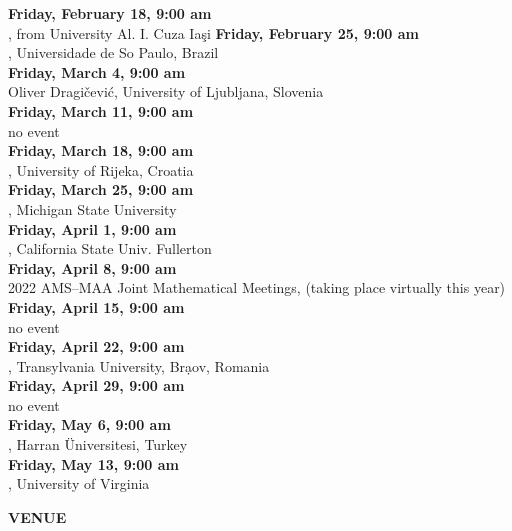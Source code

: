 \documentclass[a4paper]{article}
\begin{document}
\begin{minipage}{0.95\textwidth}
\begin{minipage}[b]{0.47\textwidth}
{\leavevmode \raggedright
\textbf{\color{cprimary} Friday, February 18, 9:00 am}\\ , from University Al. I. Cuza Ia\c{s}i
\textbf{\color{cprimary} Friday, February 25, 9:00 am}\\ , Universidade de So Paulo, Brazil\\
\textbf{\color{cprimary} Friday, March 4, 9:00 am}\\ Oliver Dragi\v{c}evi\'{c}, University of Ljubljana, Slovenia\\
\textbf{\color{cprimary} Friday, March 11, 9:00 am}\\ no event\\
\textbf{\color{cprimary} Friday, March 18, 9:00 am}\\ , University of Rijeka, Croatia\\
\textbf{\color{cprimary} Friday, March 25, 9:00 am}\\ , Michigan State University\\
\textbf{\color{cprimary} Friday, April 1, 9:00 am}\\ , California State Univ. Fullerton\\
\textbf{\color{cprimary} Friday, April 8, 9:00 am}\\ 2022 AMS--MAA Joint Mathematical Meetings, (taking place virtually this year)\\
\textbf{\color{cprimary} Friday, April 15, 9:00 am}\\ no event\\
\textbf{\color{cprimary} Friday, April 22, 9:00 am}\\ , Transylvania University, Br\d{a}ov, Romania\\
\textbf{\color{cprimary} Friday, April 29, 9:00 am}\\ no event\\
\textbf{\color{cprimary} Friday, May 6, 9:00 am}\\ , Harran \"{U}niversitesi, Turkey\\
\textbf{\color{cprimary} Friday, May 13, 9:00 am}\\ , University of Virginia\\
\par{}
}

\vspace{0.1in}
\medskip

\large{\color{csecondary}\textbf{VENUE}}


\end{minipage}
\end{minipage}
\end{document}
